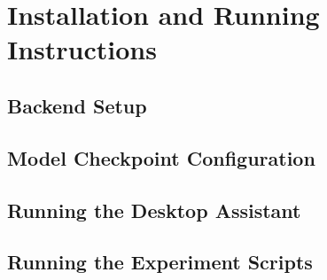 \chapter{Installation and Running Instructions}

\section{Backend Setup}

\section{Model Checkpoint Configuration}

\section{Running the Desktop Assistant}

\section{Running the Experiment Scripts}
